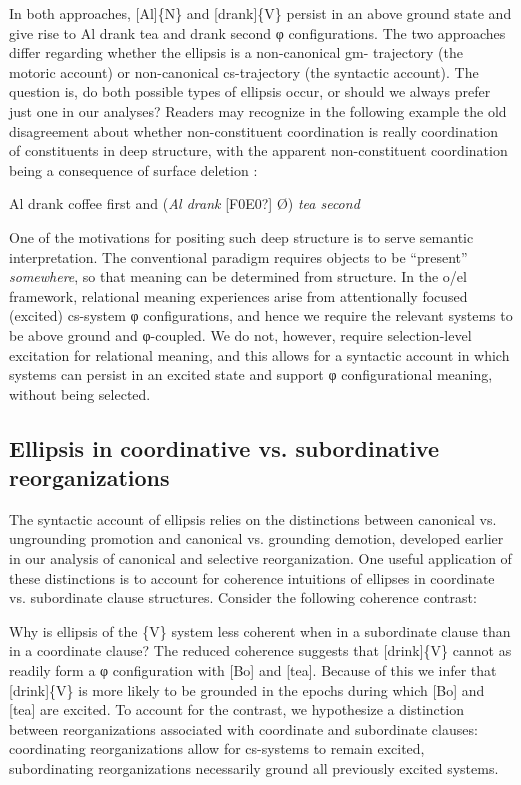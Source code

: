   In both approaches, [Al]\{N\} and [drank]\{V\} persist in an above ground state and give rise to {\textbar}Al drank tea{\textbar} and {\textbar}drank second{\textbar} φ configurations. The two approaches differ regarding whether the ellipsis is a non-canonical gm- trajectory (the motoric account) or non-canonical cs-trajectory (the syntactic account). The question is, do both possible types of ellipsis occur, or should we always prefer just one in our analyses? Readers may recognize in the following example the old disagreement about whether non-constituent coordination is really coordination of constituents in deep structure, with the apparent non-constituent coordination being a consequence of surface deletion \citep{DalrympleEtAl1991,Merchant2001,SagEtAl1985}: 

  \ea
{Al drank coffee first and} (\textit{Al drank} [F0E0?] Ø) \textit{tea second}
\z

  One of the motivations for positing such deep structure is to serve semantic interpretation. The conventional paradigm requires objects to be “present” \textit{somewhere}, so that meaning can be determined from structure. In the o/el framework, relational meaning experiences arise from attentionally focused (excited) cs-system φ configurations, and hence we require the relevant systems to be above ground and φ-coupled. We do not, however, require selection-level excitation for relational meaning, and this allows for a syntactic account in which systems can persist in an excited state and support φ configurational meaning, without being selected. 

\subsection{Ellipsis in coordinative vs. subordinative reorganizations}

The syntactic account of ellipsis relies on the distinctions between canonical vs. ungrounding promotion and canonical vs. grounding demotion, developed earlier in our analysis of canonical and selective reorganization. One useful application of these distinctions is to account for coherence intuitions of ellipses in coordinate vs. subordinate clause structures. Consider the following coherence contrast:

\ea
\z
\z

  Why is ellipsis of the \{V\} system less coherent when in a subordinate clause than in a coordinate clause? The reduced coherence suggests that [drink]\{V\} cannot as readily form a φ configuration with [Bo] and [tea]. Because of this we infer that [drink]\{V\} is more likely to be grounded in the epochs during which [Bo] and [tea] are excited. To account for the contrast, we hypothesize a distinction between reorganizations associated with coordinate and subordinate clauses: coordinating reorganizations allow for cs-systems to remain excited, subordinating reorganizations necessarily ground all previously excited systems. 

